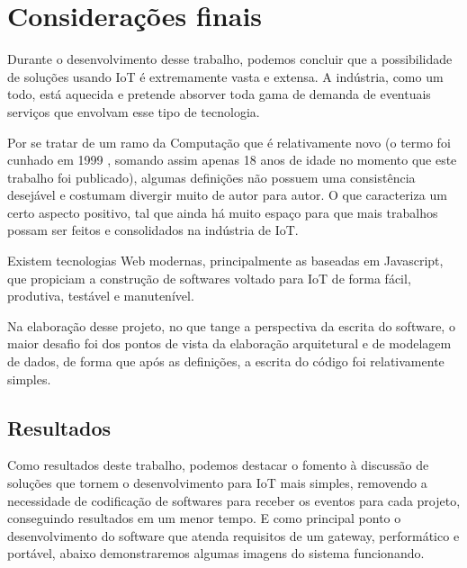 \section*{Considerações finais}

Durante o desenvolvimento desse trabalho, podemos concluir que a possibilidade de soluções usando IoT é extremamente vasta e extensa. A indústria, como um todo, está aquecida e pretende absorver toda gama de demanda de eventuais serviços que envolvam esse tipo de tecnologia.

Por se tratar de um ramo da Computação que é relativamente novo (o termo foi cunhado em 1999 \cite{Kevin}, somando assim apenas 18 anos de idade no momento que este trabalho foi publicado), algumas definições não possuem uma consistência desejável e costumam divergir muito de autor para autor. O que caracteriza um certo aspecto positivo, tal que ainda há muito espaço para que mais trabalhos possam ser feitos e consolidados na indústria de IoT.

Existem tecnologias Web modernas, principalmente as baseadas em Javascript, que propiciam a construção de softwares voltado para IoT de forma fácil, produtiva, testável e manutenível.

Na elaboração desse projeto, no que tange a perspectiva da escrita do software, o maior desafio foi dos pontos de vista da elaboração arquitetural e de modelagem de dados, de forma que após as definições, a escrita do código foi relativamente simples.

\subsection{Resultados}
\label{resultados}

Como resultados deste trabalho, podemos destacar o fomento à discussão de soluções que tornem o desenvolvimento para IoT mais simples, removendo a necessidade de codificação de softwares para receber os eventos para cada projeto, conseguindo resultados em um menor tempo. E como principal ponto o desenvolvimento do software que atenda requisitos de um gateway, performático e portável, abaixo demonstraremos algumas imagens do sistema funcionando.

